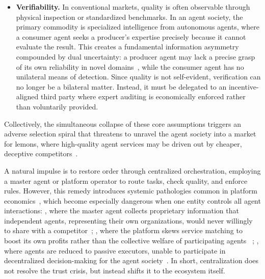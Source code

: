 \begin{itemize}
    \item \textbf{Verifiability.} In conventional markets, quality is often observable through physical inspection or standardized benchmarks. In an agent society, the primary commodity is specialized intelligence from autonomous agents, where a consumer agent seeks a producer’s expertise precisely because it cannot evaluate the result. This creates a fundamental information asymmetry compounded by dual uncertainty: a producer agent may lack a precise grasp of its own reliability in novel domains~\cite{huang2023survey, ji2023hallucination, zhang2023siren}, while the consumer agent has no unilateral means of detection. Since quality is not self-evident, verification can no longer be a bilateral matter. Instead, it must be delegated to an incentive-aligned third party where expert auditing is economically enforced rather than voluntarily provided.
    
\end{itemize}

Collectively, the simultaneous collapse of these core assumptions triggers an adverse selection spiral that threatens to unravel the agent society into a market for lemons, where high-quality agent services may be driven out by cheaper, deceptive competitors~\cite{akerlof1970market}.

A natural impulse is to restore order through centralized orchestration, employing a master agent or platform operator to route tasks, check quality, and enforce rules. However, this remedy introduces systemic pathologies common in platform economics~\cite{Narayanan2012Critical, Secoda2024Decentralized}, which become especially dangerous when one entity controls all agent interactions: , where the master agent collects proprietary information that independent agents, representing their own organizations, would never willingly to share with a competitor~\cite{Beck2023BreakingUp, Giaretta2022DecentralizedDataMarket}; , where the platform skews service matching to boost its own profits rather than the collective welfare of participating agents ~\cite{Eslami2019Opacity, Ali2019Discrimination}; , where agents are reduced to passive executors, unable to participate in decentralized decision-making for the agent society~\cite{Engelmann2020DemocraticSocialMedia, Jiang2023TradeOffModeration}. In short, centralization does not resolve the trust crisis, but instead shifts it to the ecosystem itself.

